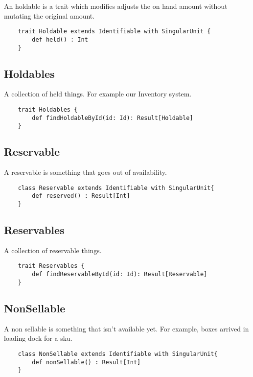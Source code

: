 \documentclass[11pt]{article}
\begin{document}
An holdable is a trait which modifies adjusts the on hand amount without mutating the original
amount.

\begin{lstlisting}
    trait Holdable extends Identifiable with SingularUnit { 
        def held() : Int
    }
\end{lstlisting}


\subsection{Holdables}

A collection of held things. For example our Inventory system.

\begin{lstlisting}
    trait Holdables { 
        def findHoldableById(id: Id): Result[Holdable]
    }
\end{lstlisting}

\subsection{Reservable}

A reservable is something that goes out of availability. 

\begin{lstlisting}
    class Reservable extends Identifiable with SingularUnit{ 
        def reserved() : Result[Int]
    }
\end{lstlisting}

\subsection{Reservables}

A collection of reservable things. 

\begin{lstlisting}
    trait Reservables {
        def findReservableById(id: Id): Result[Reservable]
    }
\end{lstlisting}

\subsection{NonSellable}

A non sellable is something that isn't available yet. For example, boxes arrived
in loading dock for a sku.

\begin{lstlisting}
    class NonSellable extends Identifiable with SingularUnit{ 
        def nonSellable() : Result[Int]
    }
\end{lstlisting}
\end{document}
